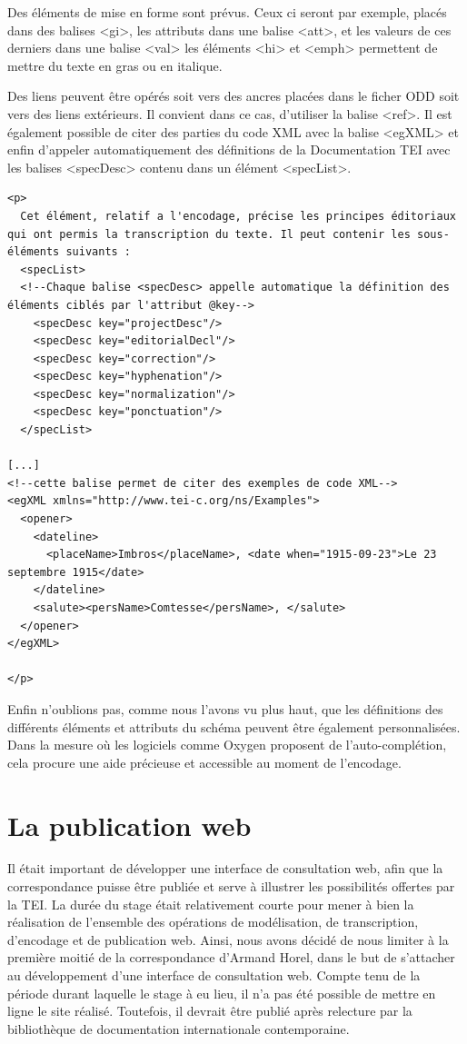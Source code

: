 \documentclass[12pt,a4paper]{book} %
\begin{document}
Des éléments de mise en forme sont prévus. Ceux ci seront par exemple, placés dans des balises <gi>, les attributs dans une balise <att>, et les valeurs de ces derniers dans une balise <val> les éléments <hi> et <emph> permettent de mettre du texte en gras ou en italique.

Des liens peuvent être opérés soit vers des ancres placées dans le ficher ODD soit vers des liens extérieurs. Il convient dans ce cas, d'utiliser la balise <ref>. Il est également possible de citer des parties du code XML avec la balise <egXML> et enfin d'appeler automatiquement des définitions de la Documentation TEI avec les balises <specDesc> contenu dans un élément <specList>.
\bigskip 

\begin{lstlisting}
<p> 
  Cet élément, relatif a l'encodage, précise les principes éditoriaux qui ont permis la transcription du texte. Il peut contenir les sous-éléments suivants : 
  <specList>
  <!--Chaque balise <specDesc> appelle automatique la définition des éléments ciblés par l'attribut @key-->
    <specDesc key="projectDesc"/>
    <specDesc key="editorialDecl"/>
    <specDesc key="correction"/>
    <specDesc key="hyphenation"/>
    <specDesc key="normalization"/>
    <specDesc key="ponctuation"/>
  </specList>

[...]
<!--cette balise permet de citer des exemples de code XML-->
<egXML xmlns="http://www.tei-c.org/ns/Examples">
  <opener>
    <dateline>
      <placeName>Imbros</placeName>, <date when="1915-09-23">Le 23 septembre 1915</date>
    </dateline>
    <salute><persName>Comtesse</persName>, </salute>
  </opener>
</egXML>  
  
</p>
\end{lstlisting}
\bigskip

Enfin n'oublions pas, comme nous l'avons vu plus haut, que les définitions des différents éléments et attributs du schéma peuvent être également personnalisées. Dans la mesure où les logiciels comme Oxygen proposent de l'auto-complétion, cela procure une aide précieuse et accessible au moment de l'encodage.


\part{La publication web}


Il était important de développer une interface de consultation web, afin que la correspondance puisse être publiée et serve à illustrer les possibilités offertes par la TEI. La durée du stage était relativement courte pour mener à bien la réalisation de l'ensemble des opérations de modélisation, de transcription, d'encodage et de publication web. Ainsi, nous avons décidé de nous limiter à la première moitié de la correspondance d'Armand Horel, dans le but de s'attacher au développement d'une interface de consultation web. 
Compte tenu de la période durant laquelle le stage à eu lieu, il n'a pas été possible de mettre en ligne le site réalisé. Toutefois, il devrait être publié après relecture par la bibliothèque de documentation internationale contemporaine.
\end{document}
